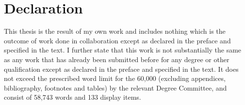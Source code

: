 \chapter{Declaration}
This thesis is the result of my own work and includes nothing which is the outcome of work done in collaboration except as declared in the preface and specified in the text. I further state that this work is not substantially the same as any work that has already been submitted before for any degree or other qualification except as declared in the preface and specified in the text. It does not exceed the prescribed word limit for the 60,000 (excluding appendices, bibliography, footnotes and tables) by the relevant Degree Committee, and consist of 58,743 words and 133 display items.



